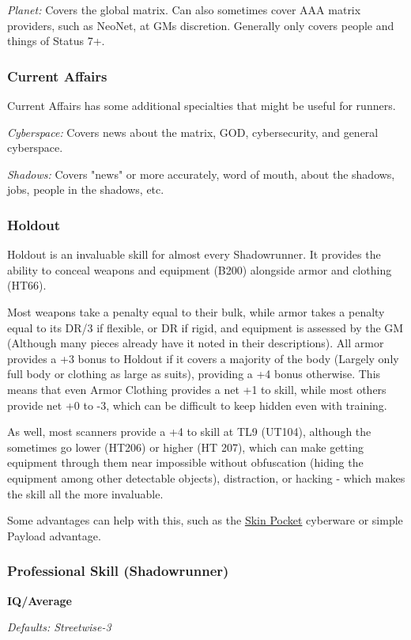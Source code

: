 \begin{multicols*}{3}
	\textit{Planet:} Covers the global matrix. Can also sometimes cover AAA matrix providers, such as NeoNet, at GMs discretion. Generally only covers people and things of Status 7+.
	
	\subsubsection*{Current Affairs}
	
	Current Affairs has some additional specialties that might be useful for runners.
	
	\textit{Cyberspace:} Covers news about the matrix, GOD, cybersecurity, and general cyberspace.
	
	\textit{Shadows:} Covers "news" or more accurately, word of mouth, about the shadows, jobs, people in the shadows, etc.
	
	\subsubsection*{Holdout}\label{holdout}
	Holdout is an invaluable skill for almost every Shadowrunner. It provides the ability to conceal weapons and equipment (B200) alongside armor and clothing (HT66). 
	
	Most weapons take a penalty equal to their bulk, while armor takes a penalty equal to its DR/3 if flexible, or DR if rigid, and equipment is assessed by the GM (Although many pieces already have it noted in their descriptions). All armor provides a +3 bonus to Holdout if it covers a majority of the body (Largely only full body or clothing as large as suits), providing a +4 bonus otherwise. This means that even Armor Clothing provides a net +1 to skill, while most others provide net +0 to -3, which can be difficult to keep hidden even with training.
	
	As well, most scanners provide a +4 to skill at TL9 (UT104), although the sometimes go lower (HT206) or higher (HT 207), which can make getting equipment through them near impossible without obfuscation (hiding the equipment among other detectable objects), distraction, or hacking - which makes the skill all the more invaluable.
	
	Some advantages can help with this, such as the \hyperref[skin_pocket]{Skin Pocket} cyberware or simple Payload advantage.	
	
	\subsubsection*{Professional Skill (Shadowrunner)}
	\begin{flushright}
		\textbf{IQ/Average}
	\end{flushright}
	\textit{\textcolor{NavyBlue}{Defaults: Streetwise-3}}
	

\end{multicols*}

